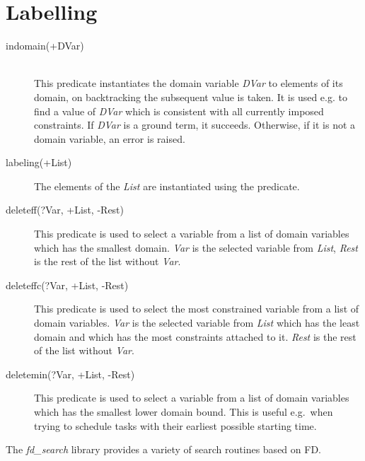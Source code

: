
\section{Labelling}
\begin{description}
\item[indomain(+DVar)]\ \\
This predicate instantiates the domain variable {\it DVar} to 
elements of its domain, on backtracking the subsequent value is taken.
It is used e.g. to find a value of {\it DVar} which is consistent
with all currently imposed constraints.
If {\it DVar} is a ground term, it succeeds.
Otherwise, if it is not a domain variable, an error is raised.

\item[labeling(+List)]
The elements of the {\it List} are instantiated using the
 predicate.

\item[deleteff(?Var, +List, -Rest)]
This predicate is used to select a variable from a list of domain variables
which has the smallest domain.
{\it Var} is the selected variable from {\it List},
{\it Rest} is the rest of the list without {\it Var}.

\item[deleteffc(?Var, +List, -Rest)]
This predicate is used to select the most constrained variable from a list
of domain variables.
{\it Var} is the selected variable from {\it List} which has the least domain
and which has the most constraints attached to it.
{\it Rest} is the rest of the list without {\it Var}.

\item[deletemin(?Var, +List, -Rest)]
This predicate is used to select a variable from a list of domain variables
which has the smallest lower domain bound. This is useful e.g.\ when trying to
schedule tasks with their earliest possible starting time.
\end{description}

The {\em fd\_search} library provides a variety of search routines
based on FD.

